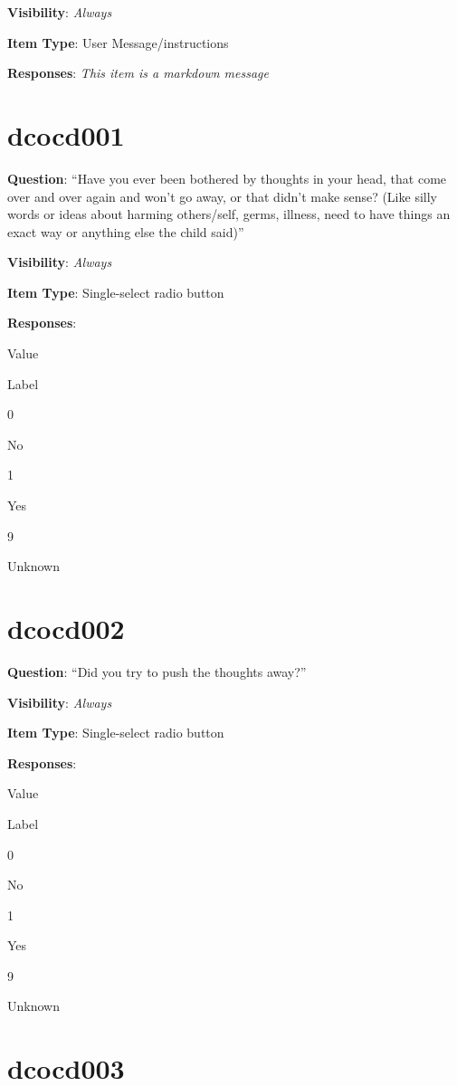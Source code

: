\documentclass[]{book}
\begin{document}
\textbf{Visibility}: \emph{Always}

\textbf{Item Type}: User Message/instructions

\textbf{Responses}: \emph{This item is a markdown message}

\hypertarget{dcocd001}{%
\section{dcocd001}\label{dcocd001}}

\textbf{Question}: ``Have you ever been bothered by thoughts in your head, that come over and over again and won't go away, or that didn't make sense? (Like silly words or ideas about harming others/self, germs, illness, need to have things an exact way or anything else the child said)''

\textbf{Visibility}: \emph{Always}

\textbf{Item Type}: Single-select radio button

\textbf{Responses}:

Value

Label

0

No

1

Yes

9

Unknown

\hypertarget{dcocd002}{%
\section{dcocd002}\label{dcocd002}}

\textbf{Question}: ``Did you try to push the thoughts away?''

\textbf{Visibility}: \emph{Always}

\textbf{Item Type}: Single-select radio button

\textbf{Responses}:

Value

Label

0

No

1

Yes

9

Unknown

\hypertarget{dcocd003}{%
\section{dcocd003}\label{dcocd003}}
\end{document}
